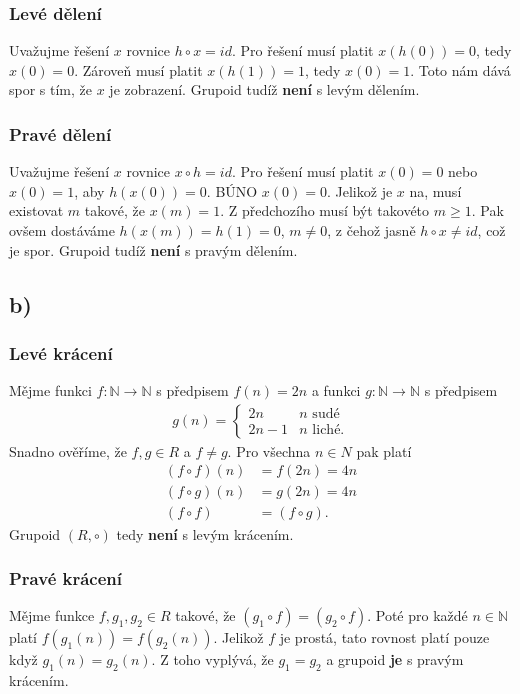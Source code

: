 \documentclass{scrartcl}
\begin{document}
    \subsubsection*{Levé dělení}
    Uvažujme řešení $x$ rovnice $h \circ x = id$. Pro řešení musí platit $x(h(0))= 0$, tedy $x(0) = 0$. Zároveň musí platit $x(h(1)) = 1$, tedy $x(0) = 1$. Toto nám dává spor s tím, že $x$ je zobrazení. Grupoid tudíž \textbf{není} s levým dělením.

    \subsubsection*{Pravé dělení}
    Uvažujme řešení $x$ rovnice $x \circ h = id$. Pro řešení musí platit $x(0) = 0$ nebo $x(0) = 1$, aby $h(x(0)) = 0$. BÚNO $x(0) = 0$. Jelikož je $x$ na, musí existovat $m$ takové, že $x(m) = 1$. Z předchozího musí být takovéto $m \geq 1$. Pak ovšem dostáváme $h(x(m)) = h(1) = 0$, $m \neq 0$, z čehož jasně $h \circ x \neq id$, což je spor. Grupoid tudíž \textbf{není} s pravým dělením.

    \subsection*{b)}
    \subsubsection*{Levé krácení}
    Mějme funkci $f:\mathbb{N} \rightarrow \mathbb{N}$ s předpisem $f(n) = 2n$ a funkci $g:\mathbb{N} \rightarrow \mathbb{N}$ s předpisem
    \begin{align*}
        g(n) =
        \begin{cases}
            2n & n \text{ sudé} \\
            2n-1 & n \text{ liché}.
        \end{cases}
    \end{align*}
    Snadno ověříme, že $f,g \in R$ a $f \neq g$. Pro všechna $n \in N$ pak platí 
    \begin{align*}
        (f \circ f)(n) &= f(2n) = 4n \\
        (f \circ g)(n) &= g(2n) = 4n \\
        (f \circ f) &= (f \circ g).
    \end{align*}
    Grupoid $(R, \circ)$ tedy \textbf{není} s levým krácením.

    \subsubsection*{Pravé krácení}
    Mějme funkce $f,g_1,g_2 \in R$ takové, že $(g_1 \circ f) = (g_2 \circ f)$. Poté pro každé $n \in \mathbb{N}$ platí $f(g_1(n)) = f(g_2(n))$. Jelikož $f$ je prostá, tato rovnost platí pouze když $g_1(n) = g_2(n)$. Z toho vyplývá, že $g_1 = g_2$ a grupoid \textbf{je} s pravým krácením.
\end{document}
